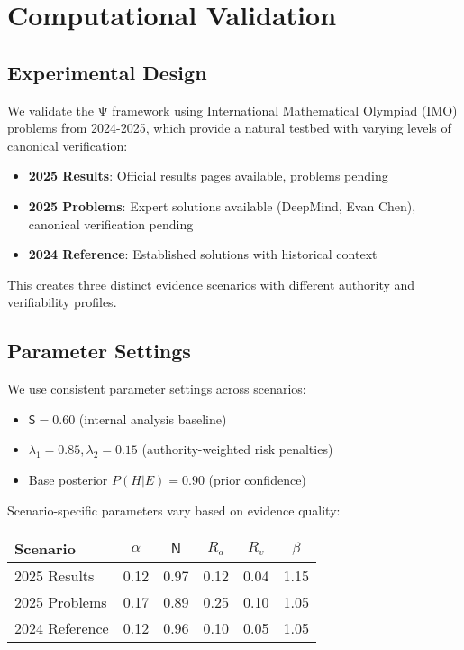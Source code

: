 \documentclass[12pt,a4paper]{article}
\newcommand{\Ssig}{\mathsf{S}}
\newcommand{\Nsig}{\mathsf{N}}
\newcommand{\alloc}{\alpha}
\newcommand{\rA}{R_a}
\newcommand{\rV}{R_v}
\newcommand{\lA}{\lambda_1}
\newcommand{\lV}{\lambda_2}
\newcommand{\uplift}{\beta}
\begin{document}
\section{Computational Validation}

\subsection{Experimental Design}

We validate the Ψ framework using International Mathematical Olympiad (IMO) problems from 2024-2025, which provide a natural testbed with varying levels of canonical verification:

\begin{itemize}
\item \textbf{2025 Results}: Official results pages available, problems pending
\item \textbf{2025 Problems}: Expert solutions available (DeepMind, Evan Chen), canonical verification pending  
\item \textbf{2024 Reference}: Established solutions with historical context
\end{itemize}

This creates three distinct evidence scenarios with different authority and verifiability profiles.

\subsection{Parameter Settings}

We use consistent parameter settings across scenarios:
\begin{itemize}
\item $\Ssig = 0.60$ (internal analysis baseline)
\item $\lA = 0.85, \lV = 0.15$ (authority-weighted risk penalties)
\item Base posterior $P(H|E) = 0.90$ (prior confidence)
\end{itemize}

Scenario-specific parameters vary based on evidence quality:

\begin{center}
\begin{tabular}{@{}lccccc@{}}
\toprule
Scenario & $\alloc$ & $\Nsig$ & $\rA$ & $\rV$ & $\uplift$ \\
\midrule
2025 Results & 0.12 & 0.97 & 0.12 & 0.04 & 1.15 \\
2025 Problems & 0.17 & 0.89 & 0.25 & 0.10 & 1.05 \\
2024 Reference & 0.12 & 0.96 & 0.10 & 0.05 & 1.05 \\
\bottomrule
\end{tabular}
\end{center}
\end{document}
